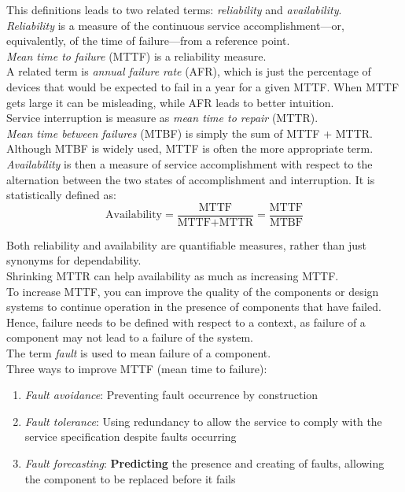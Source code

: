 \documentclass[12pt]{article}
\theoremstyle{definition}
\begin{document}
  This definitions leads to two related terms: \emph{reliability} and \emph{availability}. \\

  \emph{Reliability} is a measure of the continuous service accomplishment---or, equivalently, of the time of failure---from a reference point.\\
  \emph{Mean time to failure} (MTTF) is a reliability measure. \\
  A related term is \emph{annual failure rate} (AFR), which is just the percentage of devices that would be expected to fail in a year for a given MTTF.
  When MTTF gets large it can be misleading, while AFR leads to better intuition. \\
  Service interruption is measure as \emph{mean time to repair} (MTTR). \\
  \emph{Mean time between failures} (MTBF) is simply the sum of MTTF + MTTR.
  Although MTBF is widely used, MTTF is often the more appropriate term. \\

  \emph{Availability} is then a measure of service accomplishment with respect to the alternation between the two states of accomplishment and interruption.
  It is statistically defined as:
  $$\text{Availability} = \frac{\text{MTTF}}{\text{MTTF} + \text{MTTR}} = \frac{\text{MTTF}}{\text{MTBF}}$$

  Both reliability and availability are quantifiable measures, rather than just synonyms for dependability. \\
  Shrinking MTTR can help availability as much as increasing MTTF. \\

  To increase MTTF, you can improve the quality of the components or design systems to continue operation in the presence of components that have failed.
  Hence, failure needs to be defined with respect to a context, as failure of a component may not lead to a failure of the system. \\
  The term \emph{fault} is used to mean failure of a component. \\
  Three ways to improve MTTF (mean time to failure):
  \begin{enumerate}
    \item \emph{Fault avoidance}: Preventing fault occurrence by construction
    \item \emph{Fault tolerance}: Using redundancy to allow the service to comply with the service specification despite faults occurring
    \item \emph{Fault forecasting}: \textbf{Predicting} the presence and creating of faults, allowing the component to be replaced before it fails
  \end{enumerate}
\end{document}
